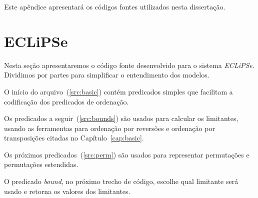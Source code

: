 

Este apêndice apresentará os códigos fontes utilizados nesta dissertação.

\section{ECLiPSe}
\label{app:src_eclipse}
Nesta seção apresentaremos o código fonte desenvolvido para o
sistema \textit{ECLiPSe}. Dividimos por partes para simplificar o
entendimento dos modelos.

O início do arquivo~(\ref{src:basic}) contém predicados simples que
facilitam a codificação dos predicados de ordenação.

\vspace{1.0cm}



Os predicados a seguir~(\ref{src:bounds}) são usados para calcular os
limitantes, usando as ferramentas para ordenação por reversões e
ordenação por transposições citadas no Capítulo~\ref{cap:basic}.

\vspace{1.0cm}



Os próximos predicados~(\ref{src:perm}) são usados para representar
  permutações e permutações estendidas.

\vspace{1.0cm}



O predicado \textit{bound}, no próximo trecho de código, escolhe qual
limitante será usado e retorna os valores dos limitantes.

